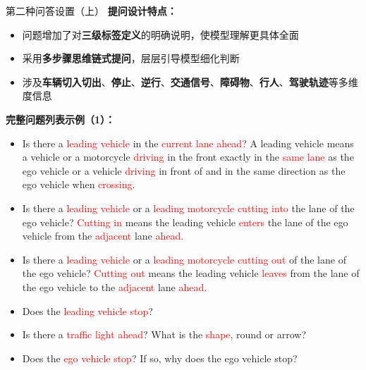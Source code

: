 \documentclass[serif]{beamer}
\begin{document}
\begin{frame}{第二种问答设置（上）}
\scriptsize
\textbf{提问设计特点：}
\begin{itemize}
  \item 问题增加了对\textbf{三级标签定义}的明确说明，使模型理解更具体全面
  \item 采用\textbf{多步骤思维链式提问}，层层引导模型细化判断
  \item 涉及\textbf{车辆切入切出}、\textbf{停止}、\textbf{逆行}、\textbf{交通信号}、\textbf{障碍物}、\textbf{行人}、\textbf{驾驶轨迹}等多维度信息
\end{itemize}

\vspace{0.6em}
\textbf{完整问题列表示例（1）：}

\begin{itemize}
  \item Is there a \textcolor{red}{leading vehicle} in the \textcolor{red}{current lane} \textcolor{red}{ahead}? A leading vehicle means a vehicle or a motorcycle \textcolor{red}{driving} in the front exactly in the \textcolor{red}{same lane} as the ego vehicle or a vehicle \textcolor{red}{driving} in front of and in the same direction as the ego vehicle when \textcolor{red}{crossing}.
  \item Is there a \textcolor{red}{leading vehicle} or a \textcolor{red}{leading motorcycle} \textcolor{red}{cutting into} the lane of the ego vehicle? \textcolor{red}{Cutting in} means the leading vehicle \textcolor{red}{enters} the lane of the ego vehicle from the \textcolor{red}{adjacent} lane \textcolor{red}{ahead}.
  \item Is there a \textcolor{red}{leading vehicle} or a \textcolor{red}{leading motorcycle} \textcolor{red}{cutting out} of the lane of the ego vehicle? \textcolor{red}{Cutting out} means the leading vehicle \textcolor{red}{leaves} from the lane of the ego vehicle to the \textcolor{red}{adjacent} lane \textcolor{red}{ahead}.
  \item Does the \textcolor{red}{leading vehicle} \textcolor{red}{stop}?
  \item Is there a \textcolor{red}{traffic light} \textcolor{red}{ahead}? What is the \textcolor{red}{shape}, round or arrow?
  \item Does the \textcolor{red}{ego vehicle} \textcolor{red}{stop}? If so, why does the ego vehicle stop?
\end{itemize}
\normalsize
\end{frame}
\end{document}
